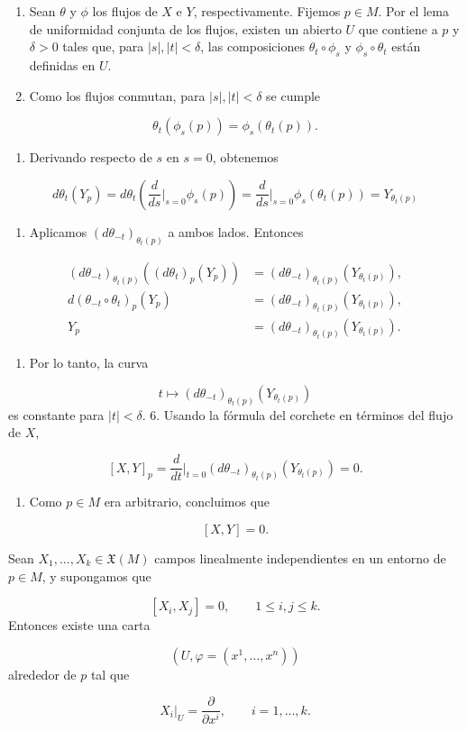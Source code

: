\begin{bookproof}{}
\begin{enumerate}
\item Sean $\theta$ y $\phi$ los flujos de $X$ e $Y$, respectivamente. Fijemos $p\in M$. Por el lema de uniformidad conjunta de los flujos, existen un abierto $U$ que contiene a $p$ y $\delta>0$ tales que, para $|s|,|t|<\delta$, las composiciones $\theta_t\circ\phi_s$ y $\phi_s\circ\theta_t$ están definidas en $U$.
\item Como los flujos conmutan, para $|s|,|t|<\delta$ se cumple
\end{enumerate}
\[
\theta_t(\phi_s(p))=\phi_s(\theta_t(p)).
\]
\begin{enumerate}[start=3]
\item Derivando respecto de $s$ en $s=0$, obtenemos
\end{enumerate}
\[
d\theta_{t}(Y_{p})=d\theta_t\left(\frac{d}{ds}\bigg|_{s=0}\phi_s(p)\right)=\frac{d}{ds}\bigg|_{s=0}\phi_s(\theta_t(p))=Y_{\theta_{t}(p)}
\]
\begin{enumerate}[start=4]
\item Aplicamos $(d\theta_{-t})_{\theta_t(p)}$ a ambos lados. Entonces
\end{enumerate}
\[
\begin{aligned}(d\theta_{-t})_{\theta_t(p)}\left((d\theta_t)_p(Y_p)\right)&=(d\theta_{-t})_{\theta_t(p)}\left(Y_{\theta_t(p)}\right),\\d(\theta_{-t}\circ\theta_t)_p(Y_p)&=(d\theta_{-t})_{\theta_t(p)}\left(Y_{\theta_t(p)}\right),\\Y_p&=(d\theta_{-t})_{\theta_t(p)}\left(Y_{\theta_t(p)}\right).\end{aligned}
\]
\begin{enumerate}[start=5]
\item Por lo tanto, la curva
\end{enumerate}
\[
t\mapsto(d\theta_{-t})_{\theta_t(p)}\left(Y_{\theta_t(p)}\right)
\]
es constante para $|t|<\delta$. 6. Usando la fórmula del corchete en términos del flujo de $X$,

\[
[X,Y]_p=\frac{d}{dt}\bigg|_{t=0}(d\theta_{-t})_{\theta_t(p)}\left(Y_{\theta_t(p)}\right)=0.
\]
\begin{enumerate}[start=7]
\item Como $p\in M$ era arbitrario, concluimos que
\end{enumerate}
\[
[X,Y]=0.
\]
\bookqed
\end{bookproof}
\begin{booktheorem}{}
Sean $X_1,\ldots,X_k\in\mathfrak X(M)$ campos linealmente independientes en un entorno de $p\in M$, y supongamos que

\[
[X_i,X_j]=0,\qquad 1\leq i,j\leq k.
\]
Entonces existe una carta

\[
(U,\varphi=(x^1,\ldots,x^n))
\]
alrededor de $p$ tal que

\[
X_i|_U=\frac{\partial}{\partial x^i},\qquad i=1,\ldots,k.
\]
\end{booktheorem}
